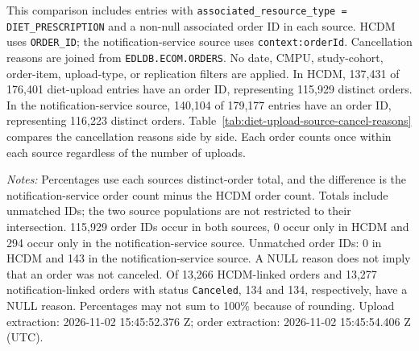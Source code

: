 \label{subsec:source-order-cancellation-reasons}
This comparison includes entries with \texttt{associated\_resource\_type = DIET\_PRESCRIPTION} and a non-null associated order ID in each source. HCDM uses \texttt{ORDER\_ID}; the notification-service source uses \texttt{context:orderId}. Cancellation reasons are joined from \texttt{EDLDB.ECOM.ORDERS}. No date, CMPU, study-cohort, order-item, upload-type, or replication filters are applied.
In HCDM, 137,431 of 176,401 diet-upload entries have an order ID, representing 115,929 distinct orders. In the notification-service source, 140,104 of 179,177 entries have an order ID, representing 116,223 distinct orders. Table~\ref{tab:diet-upload-source-cancel-reasons} compares the cancellation reasons side by side. Each order counts once within each source regardless of the number of uploads.

\noindent\textit{Notes:} Percentages use each source\textquotesingle s distinct-order total, and the difference is the notification-service order count minus the HCDM order count. Totals include unmatched IDs; the two source populations are not restricted to their intersection. 115,929 order IDs occur in both sources, 0 occur only in HCDM and 294 occur only in the notification-service source. Unmatched order IDs: 0 in HCDM and 143 in the notification-service source. A NULL reason does not imply that an order was not canceled. Of 13,266 HCDM-linked orders and 13,277 notification-linked orders with status \texttt{Canceled}, 134 and 134, respectively, have a NULL reason. Percentages may not sum to 100\% because of rounding. Upload extraction: 2026-11-02 15:45:52.376 Z; order extraction: 2026-11-02 15:45:54.406 Z (UTC).



